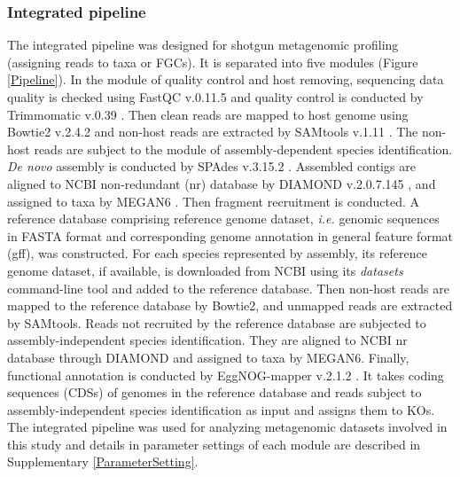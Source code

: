 \documentclass[11pt]{article}
\begin{document}
      \subsubsection{Integrated pipeline}
      The integrated pipeline was designed for shotgun metagenomic profiling (assigning reads to taxa or FGCs). 
      It is separated into five modules (Figure \ref{Pipeline}).
      \newline
      In the module of quality control and host removing, sequencing data quality is checked using FastQC v.0.11.5 \citep{andrews2010fastqc} and quality control is conducted by Trimmomatic v.0.39 \citep{bolger2014trimmomatic}. 
      Then clean reads are mapped to host genome using Bowtie2 v.2.4.2 \citep{langmead2012fast} and non-host reads are extracted by SAMtools v.1.11 \citep{li2009sequence}. 
      \newline
      The non-host reads are subject to the module of assembly-dependent species identification. 
      \textit{De novo} assembly is conducted by SPAdes v.3.15.2 \citep{prjibelski2020using}. 
      Assembled contigs are aligned to NCBI non-redundant (nr) database by DIAMOND v.2.0.7.145 \citep{buchfink2015fast}, and assigned to taxa by MEGAN6 \citep{huson2007megan}. 
      \newline
      Then fragment recruitment is conducted. 
      A reference database comprising reference genome dataset, \textit{i.e.} genomic sequences in FASTA format and corresponding genome annotation in general feature format (gff), was constructed. 
      For each species represented by assembly, its reference genome dataset, if available, is downloaded from NCBI using its \textit{datasets} command-line tool and added to the reference database. 
      Then non-host reads are mapped to the reference database by Bowtie2, and unmapped reads are extracted by SAMtools. 
      \newline
      Reads not recruited by the reference database are subjected to assembly-independent species identification. 
      They are aligned to NCBI nr database through DIAMOND and assigned to taxa by MEGAN6.
      \newline
      Finally, functional annotation is conducted by EggNOG-mapper v.2.1.2 \citep{huerta2017fast}. 
      It takes coding sequences (CDSs) of genomes in the reference database and reads subject to assembly-independent species identification as input and assigns them to KOs.
      \newline
      The integrated pipeline was used for analyzing metagenomic datasets involved in this study and details in parameter settings of each module are described in Supplementary \ref{ParameterSetting}.
      
\end{document}

